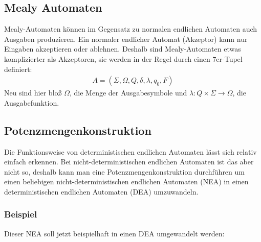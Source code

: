 \subsection{Mealy Automaten}
\begin{flushleft}
    Mealy-Automaten können im Gegensatz zu normalen endlichen Automaten auch Ausgaben produzieren.
    Ein normaler endlicher Automat (Akzeptor) kann nur Eingaben akzeptieren oder ablehnen.
    Deshalb sind Mealy-Automaten etwas komplizierter als Akzeptoren, sie werden in der Regel durch einen 7er-Tupel definiert:
    \begin{align}
        A=(\Sigma,\Omega,Q,\delta,\lambda,q_0,F)
    \end{align}
    Neu sind hier bloß $\Omega$, die Menge der Ausgabesymbole und $\lambda: Q \times \Sigma \rightarrow \Omega$, die Ausgabefunktion.
\end{flushleft}

\subsection{Potenzmengenkonstruktion}
\begin{flushleft}
    Die Funktionsweise von deterministischen endlichen Automaten lässt sich relativ einfach erkennen.
    Bei nicht-deterministischen endlichen Automaten ist das aber nicht so, deshalb kann man eine Potenzmengenkonstruktion 
    durchführen um einen beliebigen nicht-deterministischen endlichen Automaten (NEA) in einen deterministischen endlichen 
    Automaten (DEA) umzuwandeln.
    \subsubsection{Beispiel \cite{potenzmengenkonstruktion}}
    Dieser NEA soll jetzt beispielhaft in einen DEA umgewandelt werden:
\end{flushleft}
    
\begin{center}
\end{center}

